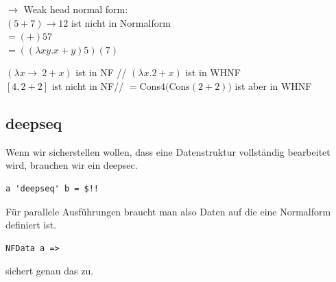 \documentclass[ngerman,a4paper]{report}
\begin{document}
$\rightarrow$ Weak head normal form:\\
$(5+7) \rightarrow  12$ ist nicht in Normalform\\
$=(+) 5 7$\\
$=((\lambda xy.x+y)5) (7)$

$(\lambda x \rightarrow \ 2 + x )$ ist in NF //
$(\lambda x. 2 + x)$ ist in WHNF\\

$[4, 2+2]$ ist nicht in NF//
$= $Cons$4($Cons$(2+2))$ ist aber in WHNF\\

\subsection{deepseq}
Wenn wir sicherstellen wollen, dass eine Datenstruktur vollständig bearbeitet wird, brauchen wir ein deepsec.\\
\begin{lstlisting} 
a 'deepseq' b = $!!
\end{lstlisting}

Für parallele Ausführungen braucht man also Daten auf die eine Normalform definiert ist.
\begin{lstlisting} 
NFData a => 
\end{lstlisting}
sichert genau das zu.
\end{document}
